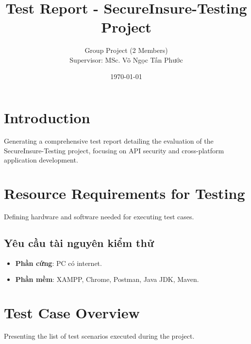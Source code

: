 \documentclass[a4paper,12pt]{article}
\begin{document}
\title{Test Report - SecureInsure-Testing Project}
\author{Group Project (2 Members) \\ Supervisor: MSc. Võ Ngọc Tấn Phước}
\date{\today}
\maketitle

\section*{Introduction}
Generating a comprehensive test report detailing the evaluation of the SecureInsure-Testing project, focusing on API security and cross-platform application development.

\section{Resource Requirements for Testing}
Defining hardware and software needed for executing test cases.

\subsection{Yêu cầu tài nguyên kiểm thử}
\begin{itemize}
    \item \textbf{Phần cứng}: PC có internet.
    \item \textbf{Phần mềm}: XAMPP, Chrome, Postman, Java JDK, Maven.
\end{itemize}

\section{Test Case Overview}
Presenting the list of test scenarios executed during the project.
\end{document}
